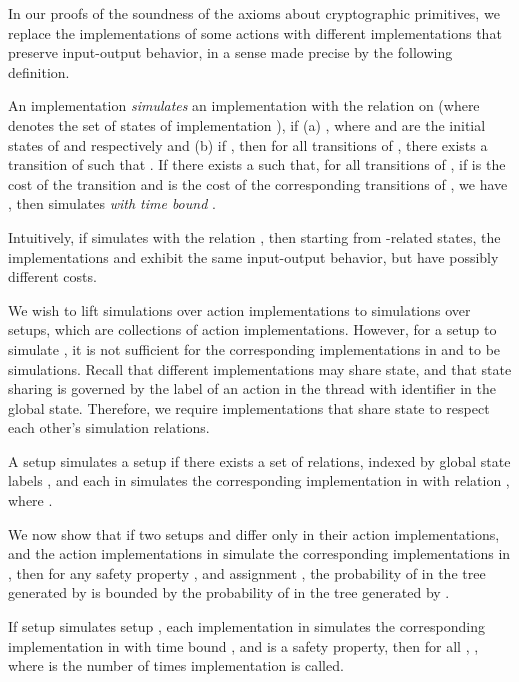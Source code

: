 In our proofs of the soundness of the axioms about cryptographic
primitives, we replace the implementations of some actions with
different implementations that preserve input-output behavior, in a
sense made precise by the following definition.


\begin{definition}[Simulation]
An implementation  \emph{simulates} an implementation 
with the relation  on 
(where  denotes the set of states of implementation ), if
(a) , where  and 
are the initial states of  and  respectively and
(b) if , then for all
transitions  of , there exists a
transition  of  such that .
If there exists a  such that, for all transitions of , if
 is the cost of the transition
and  is the cost of the
corresponding transitions of , we have
,
 then  simulates  \emph{with time bound }.
\end{definition}
\noindent Intuitively, if  simulates  with the relation , then starting from
-related states, the implementations  and  exhibit the same
input-output behavior, but have possibly different costs.

We wish to lift simulations over action implementations to simulations over
setups, which are collections of action implementations.  However, for a setup
 to simulate , it is not sufficient for
the corresponding implementations in  and  to be
simulations.  Recall that different implementations may share state, and that
state sharing is governed by the label  of an action  in the thread
with identifier
 in the global state. Therefore, we require implementations that share state
to respect each other's simulation relations.

\begin{definition} A setup  simulates a setup
 if there exists a set  of relations, indexed by global state labels  ,  and each
 in  simulates the corresponding implementation in
 with relation , where .
\end{definition}

We now show that if two setups  and  differ only in
their action implementations, and the action implementations in 
simulate the corresponding implementations in , then for any safety property ,
and assignment , the probability of  in the tree
generated by  is bounded by the probability of  in the
tree generated by .

\begin{lemma}\label{lemma:simulation-bound}
If setup  simulates
  setup , each implementation  in
   simulates the corresponding implementation in
   with time bound , and
   is a safety property,
  then for all , , where  is the
  number of times
implementation  is called.
\end{lemma}


